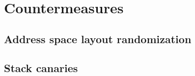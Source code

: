 \section{Countermeasures}
\subsection{Address space layout randomization}



\subsection{Stack canaries}
